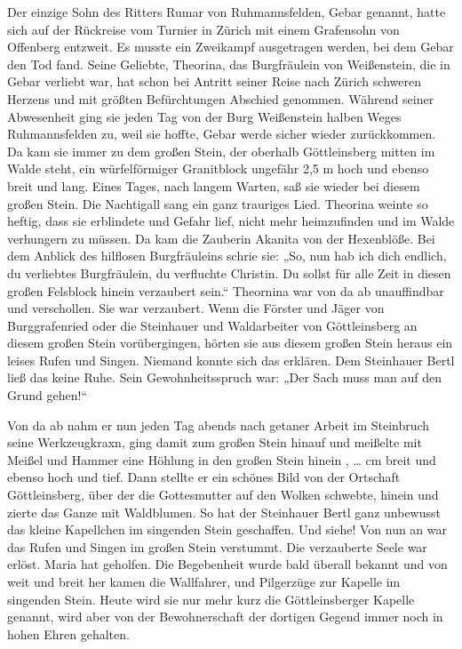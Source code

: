 \documentclass[12pt,a4pager]{book}
\begin{document}
Der einzige Sohn des Ritters Rumar von Ruhmannsfelden, Gebar genannt, hatte sich
auf der Rückreise vom Turnier in Zürich mit einem Grafensohn von Offenberg
entzweit. Es musste ein Zweikampf ausgetragen werden, bei dem Gebar den Tod
fand. Seine Geliebte, Theorina, das Burgfräulein von Weißenstein, die in Gebar
verliebt war, hat schon bei Antritt seiner Reise nach Zürich schweren Herzens
und mit größten Befürchtungen Abschied genommen. Während seiner Abwesenheit ging
sie jeden Tag von der Burg Weißenstein halben Weges Ruhmannsfelden zu, weil sie
hoffte, Gebar werde sicher wieder zurückkommen. Da kam sie immer zu dem großen
Stein, der oberhalb Göttleinsberg mitten im Walde steht, ein würfelförmiger
Granitblock ungefähr 2,5 m hoch und ebenso breit und lang. Eines Tages, nach
langem Warten, saß sie wieder bei diesem großen Stein. Die Nachtigall sang ein
ganz trauriges Lied. Theorina weinte so heftig, dass sie erblindete und Gefahr
lief, nicht mehr heimzufinden und im Walde verhungern zu müssen. Da kam die
Zauberin Akanita von der Hexenblöße. Bei dem Anblick des hilflosen Burgfräuleins
schrie sie: „So, nun hab ich dich endlich, du verliebtes Burgfräulein, du
verfluchte Christin. Du sollst für alle Zeit in diesen großen Felsblock hinein
verzaubert sein.“ Theornina war von da ab unauffindbar und verschollen. Sie war
verzaubert. Wenn die Förster und Jäger von Burggrafenried oder die Steinhauer
und Waldarbeiter von Göttleinsberg an diesem großen Stein vorübergingen, hörten
sie aus diesem großen Stein heraus ein leises Rufen und Singen. Niemand konnte
sich das erklären. Dem Steinhauer Bertl ließ das keine Ruhe. Sein
Gewohnheitsspruch war: „Der Sach muss man auf den Grund gehen!“

Von da ab nahm er nun jeden Tag abends nach getaner Arbeit im Steinbruch seine
Werkzeugkraxn, ging damit zum großen Stein hinauf und meißelte mit Meißel und
Hammer eine Höhlung in den großen Stein hinein , … cm breit und ebenso hoch und
tief. Dann stellte er ein schönes Bild von der Ortschaft Göttleinsberg, über der
die Gottesmutter auf den Wolken schwebte, hinein und zierte das Ganze mit
Waldblumen. So hat der Steinhauer Bertl ganz unbewusst das kleine Kapellchen im
singenden Stein geschaffen. Und siehe! Von nun an war das Rufen und Singen im
großen Stein verstummt. Die verzauberte Seele war erlöst. Maria hat geholfen.
Die Begebenheit wurde bald überall bekannt und von weit und breit her kamen die
Wallfahrer, und Pilgerzüge zur Kapelle im singenden Stein. Heute wird sie nur
mehr kurz die Göttleinsberger Kapelle genannt, wird aber von der Bewohnerschaft
der dortigen Gegend immer noch in hohen Ehren gehalten.
\end{document}
